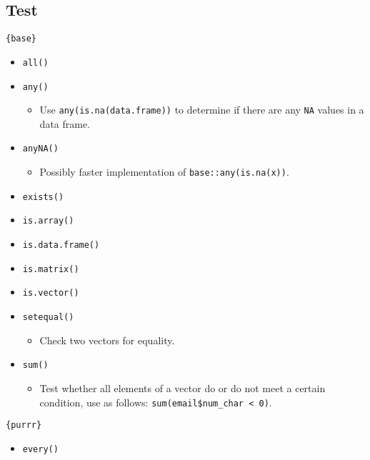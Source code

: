 \documentclass[
]{book}
\providecommand{\tightlist}{%
  \setlength{\itemsep}{0pt}\setlength{\parskip}{0pt}}
\begin{document}
\hypertarget{test}{%
\subsection{Test}\label{test}}

\texttt{\{base\}}

\begin{itemize}
\tightlist
\item
  \texttt{all()}
\item
  \texttt{any()}

  \begin{itemize}
  \tightlist
  \item
    Use \texttt{any(is.na(data.frame))} to determine if there are any \texttt{NA} values in a data frame.
  \end{itemize}
\item
  \texttt{anyNA()}

  \begin{itemize}
  \tightlist
  \item
    Possibly faster implementation of \texttt{base::any(is.na(x))}.
  \end{itemize}
\item
  \texttt{exists()}
\item
  \texttt{is.array()}
\item
  \texttt{is.data.frame()}
\item
  \texttt{is.matrix()}
\item
  \texttt{is.vector()}
\item
  \texttt{setequal()}

  \begin{itemize}
  \tightlist
  \item
    Check two vectors for equality.
  \end{itemize}
\item
  \texttt{sum()}

  \begin{itemize}
  \tightlist
  \item
    Test whether all elements of a vector do or do not meet a certain condition, use as follows: \texttt{sum(email\$num\_char\ \textless{}\ 0)}.
  \end{itemize}
\end{itemize}

\texttt{\{purrr\}}

\begin{itemize}
\tightlist
\item
  \texttt{every()}
\end{itemize}
\end{document}
